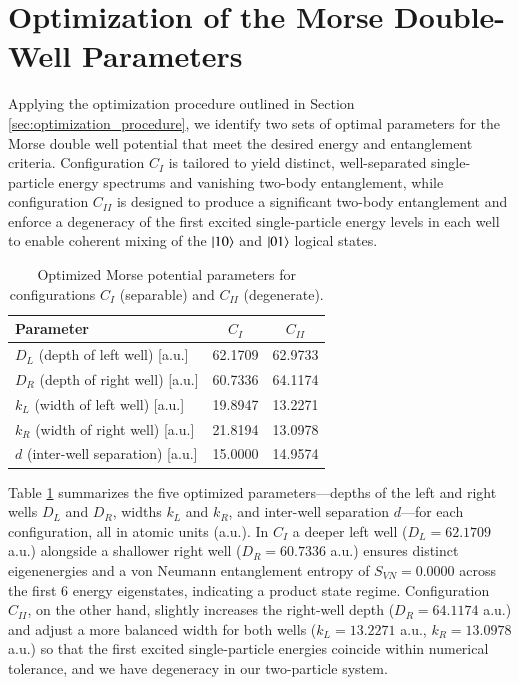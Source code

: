 \documentclass{subfiles}
\begin{document}
\section{Optimization of the Morse Double-Well Parameters}\label{sec:optimization_result}
Applying the optimization procedure outlined in Section \ref{sec:optimization_procedure}, we identify two sets of optimal parameters for the Morse double well potential that meet the desired energy and entanglement criteria. Configuration $C_I$ is tailored to yield distinct, well-separated single-particle energy spectrums and vanishing two-body entanglement, while configuration $C_{II}$ is designed to produce a significant two-body entanglement and enforce a degeneracy of the first excited single-particle energy levels in each well to enable coherent mixing of the $\ket{10}$ and $\ket{01}$ logical states.
\\ 
\begin{table}[h!]
  \centering
  \caption{Optimized Morse potential parameters for configurations \(C_I\) (separable) and \(C_{II}\) (degenerate).}
  \label{tab:optimized_params}
  \begin{tabular}{lcc}
    \toprule
    Parameter & $C_{I}$ & $C_{II}$ \\
    \midrule
    \(D_L\) (depth of left well)       [a.u.] & 62.1709 & 62.9733 \\
    \(D_R\) (depth of right well)      [a.u.] & 60.7336 & 64.1174 \\
    \(k_L\) (width of left well)       [a.u.] & 19.8947 & 13.2271 \\
    \(k_R\) (width of right well)      [a.u.] & 21.8194 & 13.0978 \\
    \(d\)   (inter-well separation)     [a.u.] & 15.0000 & 14.9574 \\
    \bottomrule
  \end{tabular}
\end{table}

Table \ref{tab:optimized_params} summarizes the five optimized parameters—depths of the left and right wells $D_L$ and $D_R$, widths $k_L$ and $k_R$, and inter-well separation $d$—for each configuration, all in atomic units (a.u.). In $C_I$ a deeper left well ($D_L = 62.1709$ a.u.) alongside a shallower right well ($D_R = 60.7336$ a.u.) ensures distinct eigenenergies and a von Neumann entanglement entropy of $S_{VN} = 0.0000$ across the first 6 energy eigenstates, indicating a product state regime. Configuration $C_{II}$, on the other hand, slightly increases the right-well depth ($D_R = 64.1174$ a.u.) and adjust a more balanced width for both wells ($k_L = 13.2271$ a.u., $k_R = 13.0978$ a.u.) so that the first excited single-particle energies coincide within numerical tolerance, and we have degeneracy in our two-particle system.
\end{document}
